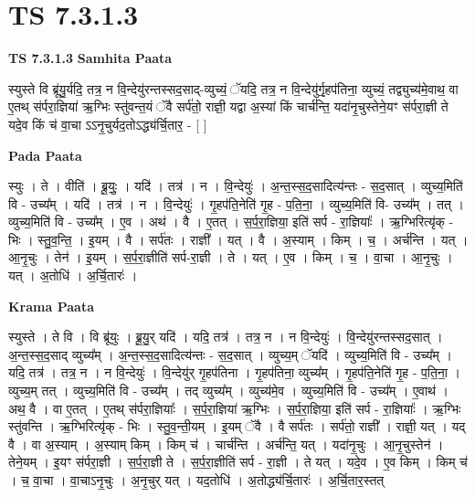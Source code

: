 \documentclass[17pt]{extarticle}
\begin{document}
\section{ TS 7.3.1.3 }

\textbf{TS 7.3.1.3 } \newline
\textbf{Samhita Paata} \newline

स्युस्ते वि ब्रू॑यु॒र्यदि॒ तत्र॒ न वि॒न्देयु॑रन्तस्सद॒साद्-व्युच्यं॒ ॅयदि॒ तत्र॒ न वि॒न्देयु॑र्गृ॒हप॑तिना॒ व्युच्यं॒ तद्व्युच्य॑मे॒वाथ॒ वा ए॒तथ् स॑र्परा॒ज्ञिया॑ ऋ॒ग्भिः स्तु॑वन्त॒यं ॅवै सर्प॑तो॒ राज्ञी॒ यद्वा अ॒स्यां किं चार्च॑न्ति॒ यदा॑नृ॒चुस्तेने॒यꣳ स॑र्परा॒ज्ञी ते यदे॒व किं च॑ वा॒चा ऽऽनृ॒चुर्यद॒तोऽद्ध्य॑र्चि॒तार॒ - [  ] \newline

\textbf{Pada Paata} \newline

स्युः । ते । वीति॑ । ब्रू॒युः॒ । यदि॑ । तत्र॑ । न । वि॒न्देयुः॑ । अ॒न्त॒स्स॒द॒सादित्य॑न्तः - स॒द॒सात् । व्युच्य॒मिति॑ वि - उच्य᳚म् । यदि॑ । तत्र॑ । न । वि॒न्देयुः॑ । गृ॒हप॑ति॒नेति॑ गृ॒ह - प॒ति॒ना॒ । व्युच्य॒मिति॑ वि- उच्य᳚म् । तत् । व्युच्य॒मिति॑ वि - उच्य᳚म् । ए॒व । अथ॑ । वै । ए॒तत् । स॒र्प॒रा॒ज्ञिया॒ इति॑ सर्प - रा॒ज्ञियाः᳚ । ऋ॒ग्भिरित्यृ॑क् - भिः । स्तु॒व॒न्ति॒ । इ॒यम् । वै । सर्प॑तः । राज्ञी᳚ । यत् । वै । अ॒स्याम् । किम् । च॒ । अर्च॑न्ति । यत् । आ॒नृ॒चुः । तेन॑ । इ॒यम् । स॒र्प॒रा॒ज्ञीति॑ सर्प-रा॒ज्ञी । ते । यत् । ए॒व । किम् । च॒ । वा॒चा । आ॒नृ॒चुः । यत् । अ॒तोधि॑ । अ॒र्चि॒तारः॑ ।  \newline


\textbf{Krama Paata} \newline

स्युस्ते । ते वि । वि ब्रू॑युः । ब्रू॒यु॒र् यदि॑ । यदि॒ तत्र॑ । तत्र॒ न । न वि॒न्देयुः॑ । वि॒न्देयु॑रन्तस्सद॒सात् । अ॒न्त॒स्स॒द॒साद् व्युच्य᳚म् । अ॒न्त॒स्स॒द॒सादित्य॑न्तः - स॒द॒सात् । व्युच्य॒म् ॅयदि॑ । व्युच्य॒मिति॑ वि - उच्य᳚म् । यदि॒ तत्र॑ । तत्र॒ न । न वि॒न्देयुः॑ । वि॒न्देयु॑र् गृ॒हप॑तिना । गृ॒हप॑तिना॒ व्युच्य᳚म् । गृ॒हप॑ति॒नेति॑ गृ॒ह - प॒ति॒ना॒ । व्युच्य॒म् तत् । व्युच्य॒मिति॑ वि - उच्य᳚म् । तद् व्युच्य᳚म् । व्युच्य॑मे॒व । व्युच्य॒मिति॑ वि - उच्य᳚म् । ए॒वाथ॑ । अथ॒ वै । वा ए॒तत् । ए॒तथ् स॑र्परा॒ज्ञियाः᳚ । स॒र्प॒रा॒ज्ञिया॑ ऋ॒ग्भिः । स॒र्प॒रा॒ज्ञिया॒ इति॑ सर्प - रा॒ज्ञियाः᳚ । ऋ॒ग्भिः स्तु॑वन्ति । ऋ॒ग्भिरित्यृ॑क् - भिः । स्तु॒व॒न्ती॒यम् । इ॒यम् ॅवै । वै सर्प॑तः । सर्प॑तो॒ राज्ञी᳚ । राज्ञी॒ यत् । यद् वै । वा अ॒स्याम् । अ॒स्याम् किम् । किम् च॑ । चार्च॑न्ति । अर्च॑न्ति॒ यत् । यदा॑नृ॒चुः । आ॒नृ॒चुस्तेन॑ । तेने॒यम् । इ॒यꣳ स॑र्परा॒ज्ञी । स॒र्प॒रा॒ज्ञी ते । स॒र्प॒रा॒ज्ञीति॑ सर्प - रा॒ज्ञी । ते यत् । यदे॒व । ए॒व किम् । किम् च॑ । च॒ वा॒चा । वा॒चाऽनृ॒चुः । अ॒नृ॒चुर् यत् । यद॒तोधि॑ । अ॒तोद्ध्य॑र्चि॒तारः॑ । अ॒र्चि॒तार॒स्तत् \newline
\end{document}

